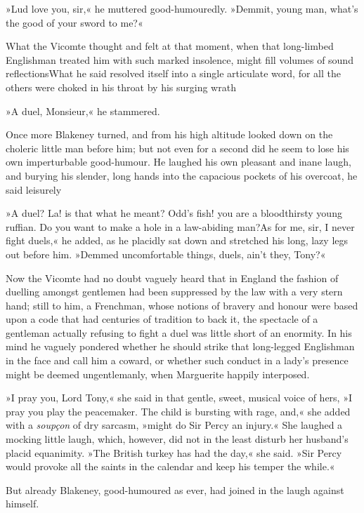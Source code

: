 »Lud love you, sir,« he muttered good-humouredly. »Demmit, young man, what's the good of your sword to me?«

What the Vicomte thought and felt at that moment, when that long-limbed Englishman treated him with such marked insolence, might fill volumes of sound reflections\textellipsis \allowbreak  What he said resolved itself into a single articulate word, for all the others were choked in his throat by his surging wrath\longdash


»A duel, Monsieur,« he stammered.

Once more Blakeney turned, and from his high altitude looked down on the choleric little man before him; but not even for a second did he seem to lose his own imperturbable good-humour. He laughed his own pleasant and inane laugh, and burying his slender, long hands into the capacious pockets of his overcoat, he said leisurely\longdash


»A duel? La! is that what he meant? Odd's fish! you are a bloodthirsty young ruffian. Do you want to make a hole in a law-abiding man?\textellipsis \allowbreak  As for me, sir, I never fight duels,« he added, as he placidly sat down and stretched his long, lazy legs out before him. »Demmed uncomfortable things, duels, ain't they, Tony?«

Now the Vicomte had no doubt vaguely heard that in England the fashion of duelling amongst gentlemen had been suppressed by the law with a very stern hand; still to him, a Frenchman, whose notions of bravery and honour were based upon a code that had centuries of tradition to back it, the spectacle of a gentleman actually refusing to fight a duel was little short of an enormity. In his mind he vaguely pondered whether he should strike that long-legged Englishman in the face and call him a coward, or whether such conduct in a lady's presence might be deemed ungentlemanly, when Marguerite happily interposed.

»I pray you, Lord Tony,« she said in that gentle, sweet, musical voice of hers, »I pray you play the peacemaker. The child is bursting with rage, and,« she added with a \textit{soupçon} of dry sarcasm, »might do Sir Percy an injury.« She laughed a mocking little laugh, which, however, did not in the least disturb her husband's placid equanimity. »The British turkey has had the day,« she said. »Sir Percy would provoke all the saints in the calendar and keep his temper the while.«

But already Blakeney, good-humoured as ever, had joined in the laugh against himself.

